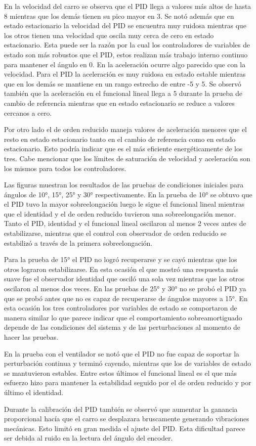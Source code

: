 En la velocidad del carro se observa que el PID llega a valores más altos de hasta 8 mientras que los demás tienen su pico mayor en 3. Se notó además que en estado estacionario la velocidad del PID se encuentra muy ruidosa mientras que los otros tienen una velocidad que oscila muy cerca de cero en estado estacionario. Esta puede ser la razón por la cual los controladores de variables de estado son más robustos que el PID, estos realizan más trabajo interno continuo para mantener el ángulo en 0. En la aceleración ocurre algo parecido que con la velocidad. Para el PID la aceleración es muy ruidosa en estado estable mientras que en los demás se mantiene en un rango estrecho de entre -5 y 5. Se observó también que la aceleración en el funcional lineal llega a 5 durante la prueba de cambio de referencia mientras que en estado estacionario se reduce a valores cercanos a cero.

Por otro lado el de orden reducido maneja valores de aceleración menores que el resto en estado estacionario tanto en el cambio de referencia como en estado estacionario. Esto podría indicar que es el más eficiente energéticamente de los tres. Cabe mencionar que los límites de saturación de velocidad y aceleración son los mismos para todos los controladores.

Las figuras muestran los resultados de las pruebas de condiciones iniciales para ángulos de 10°, 15°, 25° y 30° respectivamente. En la prueba de 10° se obtuvo que el PID tuvo la mayor sobreelongación luego le sigue el funcional lineal mientras que el identidad y el de orden reducido tuvieron una sobreelongación menor. Tanto el PID, identidad y el funcional lineal oscilaron al menos 2 veces antes de estabilizarse, mientras que el control con observador de orden reducido se estabilizó a través de la primera sobreelongación.

Para la prueba de 15° el PID no logró recuperarse y se cayó mientras que los otros lograron estabilizarse. En esta ocasión el que mostró una respuesta más suave fue el observador identidad que osciló una sola vez mientras que los otros oscilaron al menos dos veces. En las pruebas de 25° y 30° no se probó el PID ya que se probó antes que no es capaz de recuperarse de ángulos mayores a 15°. En esta ocasión los tres controladores por variables de estado se comportaron de manera similar lo que parece indicar que el comportamiento sobreamortiguado depende de las condiciones del sistema y de las perturbaciones al momento de hacer las pruebas.

En la prueba con el ventilador se notó que el PID no fue capaz de soportar la perturbación continua y terminó cayendo, mientras que los de variables de estado se mantuvieron estables. Entre estos últimos el funcional lineal es el que más esfuerzo hizo para mantener la estabilidad seguido por el de orden reducido y por último el identidad.

Durante la calibración del PID también se observó que aumentar la ganancia proporcional hacía que el carro se desplazara bruscamente generando vibraciones mecánicas. Esto limitó en gran medida el ajuste del PID. Esta dificultad parece ser debida al ruido en la lectura del ángulo del encoder.
